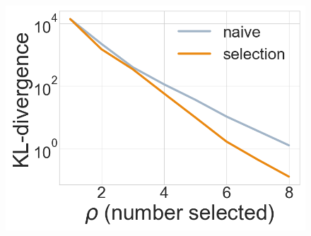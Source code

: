 \documentclass{beamer}                             %
\begin{document}
\begin{frame}
\begin{columns}
\begin{column}{0.4\textwidth}
    \begin{figure}[h!]
      \centering
      \includegraphics[width=\textwidth]{data/rho_kl-div}
    \end{figure}
  \end{column}
\end{columns}

{\let\thefootnote\relax\footnotetext{~ \newline ~}}
\end{frame}
\endgroup
\end{document}
